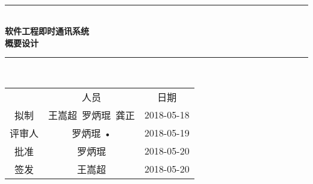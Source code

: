 \documentclass[bachelor]{ustcthesis}
\newcommand{\HRule}{\rule{\linewidth}{0.5mm}}
\begin{document}
\begin{titlepage}
\begin{center}
~\\[5cm]
\HRule \\[0.4cm]
{\huge \bfseries 软件工程即时通讯系统\\概要设计}\\[0.4cm]
\HRule \\[1.5cm]

\begin{tabular}{ccc}
  & 人员 & 日期 \\ 
拟制 & 王嵩超\ 罗炳琨\ 龚正 & 2018-05-18 \\ 
评审人 & 罗炳琨 • & 2018-05-19 \\ 
批准 & 罗炳琨 & 2018-05-20 \\ 
签发 & 王嵩超 & 2018-05-20 \\ 
\end{tabular} 

\end{center}
\end{titlepage}



\frontmatter

\tableofcontents
\listoffigures
\listoftables
% 

\mainmatter











%
%
%
%
%
% 
\end{document}
